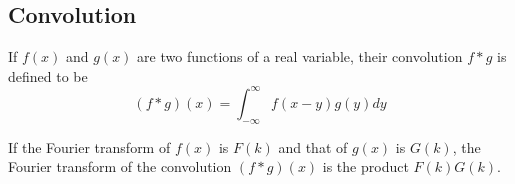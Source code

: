 \documentclass[12pt, a4paper, oneside, openright, titlepage]{book}
\begin{document}
\subsection{Convolution}

\begin{defn}
    If $f(x)$ and $g(x)$ are two functions of a real variable, their convolution $f*g$ is defined to be \begin{equation*}
        (f*g)(x) = \int_{-\infty}^{\infty}f(x-y)g(y)dy
    \end{equation*}
\end{defn}
If the Fourier transform of $f(x)$ is $F(k)$ and that of $g(x)$ is $G(k)$, the Fourier transform of the convolution $(f*g)(x)$ is the product $F(k)G(k)$.




\end{document}
